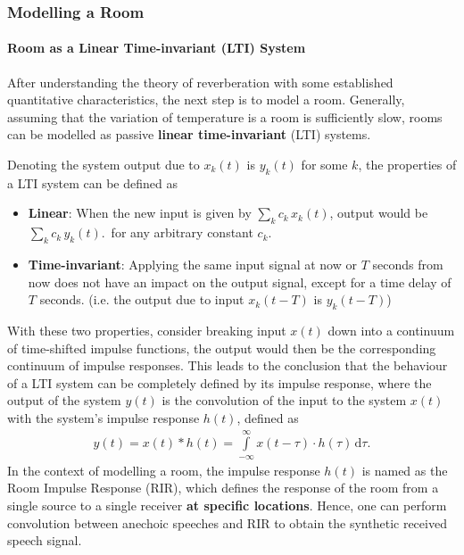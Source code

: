 \documentclass[a4paper,twoside,12pt,hidelinks]{article}
\begin{document}
\subsubsection{Modelling a Room}
\paragraph{Room as a Linear Time-invariant (LTI) System}
After understanding the theory of reverberation with some established quantitative characteristics, the next step is to model a room. Generally, assuming that the variation of temperature is a room is sufficiently slow, rooms can be modelled as passive \textbf{linear time-invariant} (LTI) systems. 

Denoting the system output due to $x_k(t)$ is $y_k(t)$ for some $k$, the properties of a LTI system can be defined as
\begin{itemize}
\item \textbf{Linear}: When the new input is given by $ \sum _{k}c_{k}\,x_{k}(t)$, output would be $\sum_{k}c_{k}\,y_{k}(t).\,$ for any arbitrary constant $c_k$.
\item \textbf{Time-invariant}: Applying the same input signal at now or $T$ seconds from now does not have an impact on the output signal, except for a time delay of $T$ seconds. (i.e. the output due to input $x_k(t-T)$ is $y_k(t-T)$)
\end{itemize}

With these two properties, consider breaking input $x(t)$ down into a continuum of time-shifted impulse functions, the output would then be the corresponding continuum of impulse responses. This leads to the conclusion that the behaviour of a LTI system can be completely defined by its impulse response, where the output of the system $y(t)$ is the convolution of the input to the system $x(t)$ with the system's impulse response $h(t)$, defined as
\begin{align}
y(t)=x(t)*h(t)=\int \limits_{-\infty }^{\infty }x(t-\tau )\cdot h(\tau )\,\mathrm {d} \tau.
\end{align}
In the context of modelling a room, the impulse response $h(t)$ is named as the Room Impulse Response (RIR), which defines the response of the room from a single source to a single receiver \textbf{at specific locations}. Hence, one can perform convolution between anechoic speeches and RIR to obtain the synthetic received speech signal.
\end{document}

